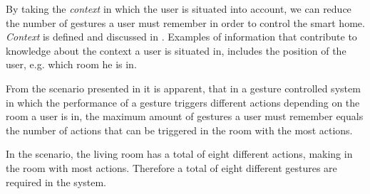 By taking the \emph{context} in which the user is situated into account, we can reduce the number of gestures a user must remember in order to control the smart home. \emph{Context} is defined and discussed in . Examples of information that contribute to knowledge about the context a user is situated in, includes the position of the user, e.g. which room he is in.

From the scenario presented in  it is apparent, that in a gesture controlled system in which the performance of a gesture triggers different actions depending on the room a user is in, the maximum amount of gestures a user must remember equals the number of actions that can be triggered in the room with the most actions.

In the scenario, the living room has a total of eight different actions, making in the room with most actions. Therefore a total of eight different gestures are required in the system.

